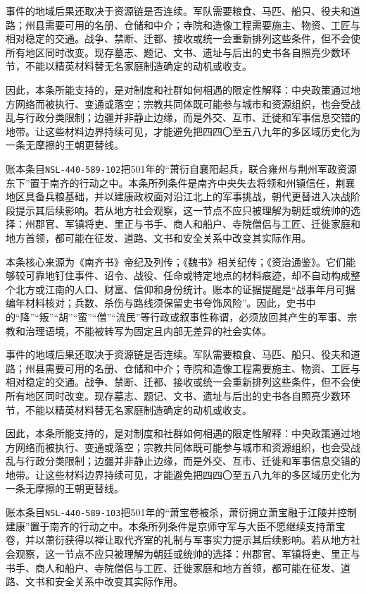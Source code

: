 事件的地域后果还取决于资源链是否连续。军队需要粮食、马匹、船只、役夫和道路；州县需要可用的名册、仓储和中介；寺院和造像工程需要施主、物资、工匠与相对稳定的交通。战争、禁断、迁都、接收或统一会重新排列这些条件，但不会使所有地区同时改变。现存墓志、题记、文书、遗址与后出的史书各自照亮少数环节，不能以精英材料替无名家庭制造确定的动机或收支。

因此，本条所能支持的，是对制度和社群如何相遇的限定性解释：中央政策通过地方网络而被执行、变通或落空；宗教共同体既可能参与城市和资源组织，也会受战乱与行政分类限制；边疆并非静止边缘，而是外交、互市、迁徙和军事信息交错的地带。让这些材料边界持续可见，才能避免把四四〇至五八九年的多区域历史化为一条无摩擦的王朝更替线。

账本条目\texttt{NSL-440-589-102}把501年的“萧衍自襄阳起兵，联合雍州与荆州军政资源东下”置于南齐的行动之中。本条所列条件是南齐中央失去将领和州镇信任，荆襄地区具备兵粮基础，并以建康政权面对沿江北上的军事挑战，朝代更替进入决战阶段提示其后续影响。若从地方社会观察，这一节点不应只被理解为朝廷或统帅的选择：州郡官、军镇将吏、里正与书手、商人和船户、寺院僧侣与工匠、迁徙家庭和地方首领，都可能在征发、道路、文书和安全关系中改变其实际作用。

本条核心来源为《南齐书》帝纪及列传；《魏书》相关纪传；《资治通鉴》。它们能够较可靠地钉住事件、诏令、战役、任命或特定地点的材料痕迹，却不自动构成整个北方或江南的人口、财富、信仰和身份统计。账本的证据提醒是“战事年月可据编年材料核对；兵数、杀伤与路线须保留史书夸饰风险”。因此，史书中的“降”“叛”“胡”“蛮”“僧”“流民”等行政或叙事性称谓，必须放回其产生的军事、宗教和治理语境，不能被转写为固定且内部无差异的社会实体。

事件的地域后果还取决于资源链是否连续。军队需要粮食、马匹、船只、役夫和道路；州县需要可用的名册、仓储和中介；寺院和造像工程需要施主、物资、工匠与相对稳定的交通。战争、禁断、迁都、接收或统一会重新排列这些条件，但不会使所有地区同时改变。现存墓志、题记、文书、遗址与后出的史书各自照亮少数环节，不能以精英材料替无名家庭制造确定的动机或收支。

因此，本条所能支持的，是对制度和社群如何相遇的限定性解释：中央政策通过地方网络而被执行、变通或落空；宗教共同体既可能参与城市和资源组织，也会受战乱与行政分类限制；边疆并非静止边缘，而是外交、互市、迁徙和军事信息交错的地带。让这些材料边界持续可见，才能避免把四四〇至五八九年的多区域历史化为一条无摩擦的王朝更替线。

账本条目\texttt{NSL-440-589-103}把501年的“萧宝卷被杀，萧衍拥立萧宝融于江陵并控制建康”置于南齐的行动之中。本条所列条件是京师守军与大臣不愿继续支持萧宝卷，并以萧衍获得以禅让取代齐室的礼制与军事实力提示其后续影响。若从地方社会观察，这一节点不应只被理解为朝廷或统帅的选择：州郡官、军镇将吏、里正与书手、商人和船户、寺院僧侣与工匠、迁徙家庭和地方首领，都可能在征发、道路、文书和安全关系中改变其实际作用。

